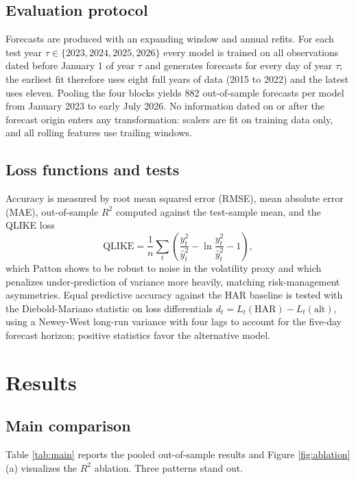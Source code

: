 \documentclass[10pt,twocolumn]{article}
\begin{document}
\subsection{Evaluation protocol}
Forecasts are produced with an expanding window and annual refits. For each test year $\tau\in\{2023,2024,2025,2026\}$ every model is trained on all observations dated before January 1 of year $\tau$ and generates forecasts for every day of year $\tau$; the earliest fit therefore uses eight full years of data (2015 to 2022) and the latest uses eleven. Pooling the four blocks yields 882 out-of-sample forecasts per model from January 2023 to early July 2026. No information dated on or after the forecast origin enters any transformation: scalers are fit on training data only, and all rolling features use trailing windows.

\subsection{Loss functions and tests}
Accuracy is measured by root mean squared error (RMSE), mean absolute error (MAE), out-of-sample $R^2$ computed against the test-sample mean, and the QLIKE loss
\begin{equation}
\mathrm{QLIKE}=\frac{1}{n}\sum_{t}\left(\frac{y_t^2}{\hat y_t^2}-\ln\frac{y_t^2}{\hat y_t^2}-1\right),
\end{equation}
which Patton \cite{patton2011} shows to be robust to noise in the volatility proxy and which penalizes under-prediction of variance more heavily, matching risk-management asymmetries. Equal predictive accuracy against the HAR baseline is tested with the Diebold-Mariano statistic \cite{diebold1995} on loss differentials $d_t=L_t(\mathrm{HAR})-L_t(\mathrm{alt})$, using a Newey-West long-run variance with four lags to account for the five-day forecast horizon; positive statistics favor the alternative model.

\section{Results}
\subsection{Main comparison}
Table \ref{tab:main} reports the pooled out-of-sample results and Figure \ref{fig:ablation}(a) visualizes the $R^2$ ablation. Three patterns stand out.
\end{document}
